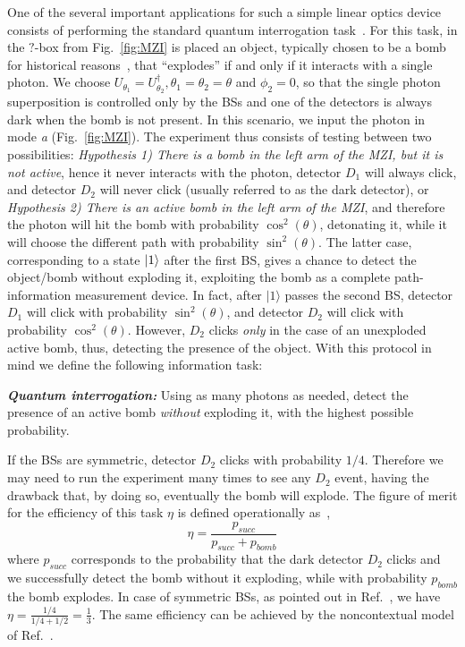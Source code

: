 \documentclass[letterpaper,onecolumn,12pt,accepted=2024-01-17]{article}
\begin{document}
One of the several important applications for such a simple linear optics device consists of performing the standard quantum interrogation task~\cite{elitzur1993quantum,vaidman1996interaction}. For this task, in the $?$-box from Fig.~\ref{fig:MZI} is placed an object, typically chosen to be a bomb for historical reasons~\cite{elitzur1993quantum}, that ``explodes'' if and only if it interacts with a single photon. We choose $U_{\theta_1}=U_{\theta_2}^\dagger, \theta_1=\theta_2=\theta$ and $\phi_2=0$, so that the single photon superposition is controlled only by the BSs and one of the detectors is always dark when the bomb is not present. In this scenario, we input the photon in mode \textit{a} (Fig.~\ref{fig:MZI}). The experiment thus consists of testing between two possibilities: \textit{Hypothesis 1) There is a bomb in the left arm of the MZI, but it is not active}, hence it never interacts with the photon,  detector $D_1$ will always click, and detector $D_2$ will never click (usually referred to as the dark detector), or \textit{Hypothesis 2) There is an active bomb in the left arm of the MZI}, and therefore the photon will hit the bomb with probability $\cos^2(\theta)$, detonating it, while it will choose the different path with probability $\sin^2(\theta)$. The latter case, corresponding to a state $\ket{1}$ after the first BS, gives a chance to detect the object/bomb without exploding it, exploiting the bomb as a complete path-information measurement device. In fact, after $\vert 1 \rangle$ passes the second BS, detector $D_1$ will click with probability $\sin^2(\theta)$, and detector $D_2$ will click with probability $\cos^2(\theta)$. However, $D_2$ clicks \textit{only} in the case of an unexploded active bomb, thus, detecting the presence of the object. With this protocol in mind we define the following information task:
\begin{tcolorbox}[colback=blue!6,colframe=blue!35,left=1mm,right=1mm,top=1mm,bottom=1mm,arc=0mm]
\textit{\textbf{Quantum interrogation:}} Using as many photons as needed, detect the presence of an active bomb \textit{without} exploding it, with the highest possible probability.
\end{tcolorbox}

If the BSs are symmetric, detector $D_2$ clicks with probability $1/4$. Therefore we may need to run the experiment many times to see any $D_2$ event, having the drawback that, by doing so, eventually the bomb will explode. The figure of merit for the efficiency of this task $\eta$ is defined operationally as~\cite{elitzur1993quantum,kwiat1995interactionfree},
\begin{equation}\label{eq: efficiency}
    \eta = \frac{p_{succ}}{p_{succ} + p_{bomb}}
\end{equation}
where $p_{succ}$ corresponds to the probability that the dark detector $D_2$ clicks and we successfully detect the bomb without it exploding, while with probability $p_{bomb}$ the bomb explodes. In case of symmetric BSs, as pointed out in Ref.~\cite{elitzur1993quantum}, we have $\eta = \frac{1/4}{1/4+1/2} = \frac{1}{3}$. The same efficiency can be achieved by the noncontextual model of Ref.~\cite{catani2021interference}.
\end{document}
